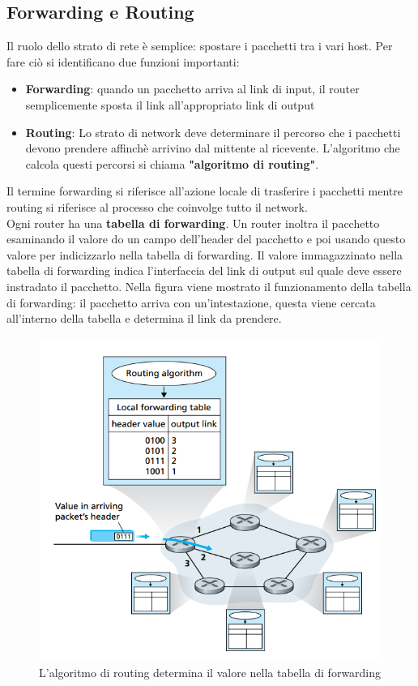 \documentclass[11pt,a4paper]{book}
\begin{document}
\subsection{Forwarding e Routing}
Il ruolo dello strato di rete è semplice: spostare i pacchetti tra i vari host. Per fare ciò si identificano due funzioni importanti:
\begin{itemize}
	\item \textbf{Forwarding}: quando un pacchetto arriva al link di input, il router semplicemente sposta il link all'appropriato link di output
	\item \textbf{Routing}: Lo strato di network deve determinare il percorso che i pacchetti devono prendere affinchè arrivino dal mittente al ricevente. L'algoritmo che calcola questi percorsi si chiama \textbf{"algoritmo di routing"}.
\end{itemize}
Il termine forwarding si riferisce all'azione locale di trasferire i pacchetti mentre routing si riferisce al processo che coinvolge tutto il network. \\
Ogni router ha una \textbf{tabella di forwarding}. Un router inoltra il pacchetto esaminando il valore do un campo dell'header del pacchetto e poi usando questo valore per indicizzarlo nella tabella di forwarding. Il valore immagazzinato nella tabella di forwarding indica l'interfaccia del link di output sul quale deve essere instradato il pacchetto.
Nella figura viene mostrato il funzionamento della tabella di forwarding: il pacchetto arriva con un'intestazione, questa viene cercata all'interno della tabella e determina il link da prendere.
\begin{figure}
	\begin{center}
		\includegraphics[scale=0.6]{img/050.png}
		\caption{L'algoritmo di routing determina il valore nella tabella di forwarding}
	\end{center}
\end{figure}
\end{document}
